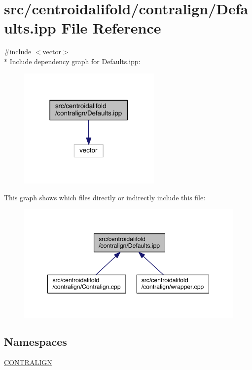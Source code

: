 \hypertarget{centroidalifold_2contralign_2_defaults_8ipp}{\section{src/centroidalifold/contralign/\+Defaults.ipp File Reference}
\label{centroidalifold_2contralign_2_defaults_8ipp}
}
{\ttfamily \#include $<$vector$>$}\\*
Include dependency graph for Defaults.\+ipp\+:
\nopagebreak
\begin{figure}[H]
\begin{center}
\leavevmode
\includegraphics[width=198pt]{centroidalifold_2contralign_2_defaults_8ipp__incl}
\end{center}
\end{figure}
This graph shows which files directly or indirectly include this file\+:
\nopagebreak
\begin{figure}[H]
\begin{center}
\leavevmode
\includegraphics[width=348pt]{centroidalifold_2contralign_2_defaults_8ipp__dep__incl}
\end{center}
\end{figure}
\subsection*{Namespaces}
\begin{DoxyCompactItemize}
\item 
 \hyperlink{namespace_c_o_n_t_r_a_l_i_g_n}{C\+O\+N\+T\+R\+A\+L\+I\+G\+N}
\end{DoxyCompactItemize}
